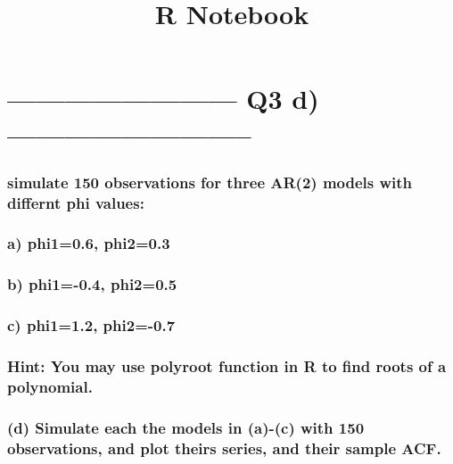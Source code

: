 \documentclass[
]{article}
\title{R Notebook}
\author{}
\date{\vspace{-2.5em}}
\begin{document}
\maketitle

\hypertarget{q3-d}{%
\section{------------------------ Q3 d)
--------------------------}\label{q3-d}}

\hypertarget{simulate-150-observations-for-three-ar2-models-with-differnt-phi-values}{%
\subsubsection{simulate 150 observations for three AR(2) models with
differnt phi
values:}\label{simulate-150-observations-for-three-ar2-models-with-differnt-phi-values}}

\hypertarget{a-phi10.6-phi20.3}{%
\subsubsection{a) phi1=0.6, phi2=0.3}\label{a-phi10.6-phi20.3}}

\hypertarget{b-phi1-0.4-phi20.5}{%
\subsubsection{b) phi1=-0.4, phi2=0.5}\label{b-phi1-0.4-phi20.5}}

\hypertarget{c-phi11.2-phi2-0.7}{%
\subsubsection{c) phi1=1.2, phi2=-0.7}\label{c-phi11.2-phi2-0.7}}

\hypertarget{hint-you-may-use-polyroot-function-in-r-to-find-roots-of-a-polynomial.}{%
\subsubsection{Hint: You may use polyroot function in R to find roots of
a
polynomial.}\label{hint-you-may-use-polyroot-function-in-r-to-find-roots-of-a-polynomial.}}

\hypertarget{d-simulate-each-the-models-in-a-c-with-150-observations-and-plot-theirs-series-and-their-sample-acf.}{%
\subsubsection{(d) Simulate each the models in (a)-(c) with 150
observations, and plot theirs series, and their sample
ACF.}\label{d-simulate-each-the-models-in-a-c-with-150-observations-and-plot-theirs-series-and-their-sample-acf.}}
\end{document}
